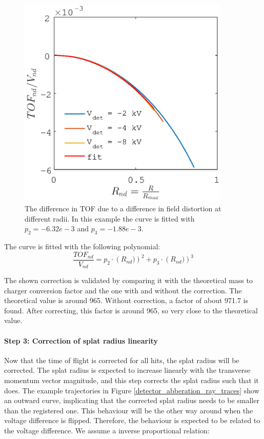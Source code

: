 \begin{figure}[h]
   \centering
    \centerline{\includegraphics[width=0.9\textwidth]{Graphics/dTOF_dR_nd.eps}}
\caption{The difference in TOF due to a difference in field distortion at different radii. In this example the curve is fitted with $p_2 = -6.32e-3$ and $p_3 = -1.88e-3$. }
\label{dTOF_dR_nd}
\end{figure}

The curve is fitted with the following polynomial:
\begin{equation}
\frac{TOF_{nd}}{V_{nd}} 	= p_2 \cdot \left(R_{nd}) \right)^2 + p_3 \cdot \left(R_{nd}) \right)^3
\end{equation}

The shown correction is validated by comparing it with the theoretical mass to charger conversion factor and the one with and without the correction. The theoretical value is around 965. Without correction, a factor of about 971.7 is found. After correcting, this factor is around 965, so very close to the theoretical value.

\paragraph{Step 3: Correction of splat radius linearity}
Now that the time of flight is corrected for all hits, the splat radius will be corrected. The splat radius is expected to increase linearly with the transverse momentum vector magnitude, and this step corrects the splat radius such that it does. The example trajectories in Figure \ref{detector_abberation_ray_traces} show an outward curve, implicating that the corrected splat radius needs to be smaller than the registered one. This behaviour will be the other way around when the voltage difference is flipped. Therefore, the behaviour is expected to be related to the voltage difference. We assume a inverse proportional relation:

